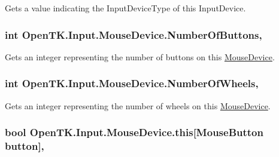 Gets a value indicating the Input\-Device\-Type of this Input\-Device. 

\hypertarget{class_open_t_k_1_1_input_1_1_mouse_device_af253d36f1acd03668ef5153948089294}{
\subsubsection[{Number\-Of\-Buttons}]{\setlength{\rightskip}{0pt plus 5cm}int Open\-T\-K.\-Input.\-Mouse\-Device.\-Number\-Of\-Buttons\hspace{0.3cm}{\ttfamily [get]}, {\ttfamily [set]}}}\label{class_open_t_k_1_1_input_1_1_mouse_device_af253d36f1acd03668ef5153948089294}


Gets an integer representing the number of buttons on this \hyperlink{class_open_t_k_1_1_input_1_1_mouse_device}{Mouse\-Device}. 

\hypertarget{class_open_t_k_1_1_input_1_1_mouse_device_ace88c5884e2e50314644aedc8d29efcc}{
\subsubsection[{Number\-Of\-Wheels}]{\setlength{\rightskip}{0pt plus 5cm}int Open\-T\-K.\-Input.\-Mouse\-Device.\-Number\-Of\-Wheels\hspace{0.3cm}{\ttfamily [get]}, {\ttfamily [set]}}}\label{class_open_t_k_1_1_input_1_1_mouse_device_ace88c5884e2e50314644aedc8d29efcc}


Gets an integer representing the number of wheels on this \hyperlink{class_open_t_k_1_1_input_1_1_mouse_device}{Mouse\-Device}. 

\hypertarget{class_open_t_k_1_1_input_1_1_mouse_device_a810e7103dac839c811324ef808365f8e}{
\subsubsection[{this[Mouse\-Button button]}]{\setlength{\rightskip}{0pt plus 5cm}bool Open\-T\-K.\-Input.\-Mouse\-Device.\-this\mbox{[}{\bf Mouse\-Button} button\mbox{]}\hspace{0.3cm}{\ttfamily [get]}, {\ttfamily [set]}}}\label{class_open_t_k_1_1_input_1_1_mouse_device_a810e7103dac839c811324ef808365f8e}



